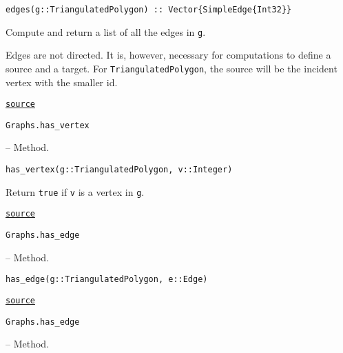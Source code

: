 \begin{adjustwidth}{2em}{0pt}


\begin{verbatim}
edges(g::TriangulatedPolygon) :: Vector{SimpleEdge{Int32}}
\end{verbatim}

Compute and return a list of all the edges in \texttt{g}.

Edges are not directed. It is, however, necessary for computations to define a source and a target.  For \texttt{TriangulatedPolygon}, the source will be the incident vertex with the smaller id.



\href{https://github.com/schto223/FlipGraphs.jl/blob/490c01a7adf74b42f27dda05099165c47ae8133e/src/polygonTriangulations.jl#L63-L70}{\texttt{source}}


\end{adjustwidth}
\hypertarget{11099834342798379214}{\texttt{Graphs.has\_vertex}}  -- {Method.}

\begin{adjustwidth}{2em}{0pt}


\begin{verbatim}
has_vertex(g::TriangulatedPolygon, v::Integer)
\end{verbatim}

Return \texttt{true} if \texttt{v} is a vertex in \texttt{g}. 



\href{https://github.com/schto223/FlipGraphs.jl/blob/490c01a7adf74b42f27dda05099165c47ae8133e/src/polygonTriangulations.jl#L88-L92}{\texttt{source}}


\end{adjustwidth}
\hypertarget{14090102072355441192}{\texttt{Graphs.has\_edge}}  -- {Method.}

\begin{adjustwidth}{2em}{0pt}


\begin{verbatim}
has_edge(g::TriangulatedPolygon, e::Edge)
\end{verbatim}



\href{https://github.com/schto223/FlipGraphs.jl/blob/490c01a7adf74b42f27dda05099165c47ae8133e/src/polygonTriangulations.jl#L77-L79}{\texttt{source}}


\end{adjustwidth}
\hypertarget{9162594476608360322}{\texttt{Graphs.has\_edge}}  -- {Method.}

